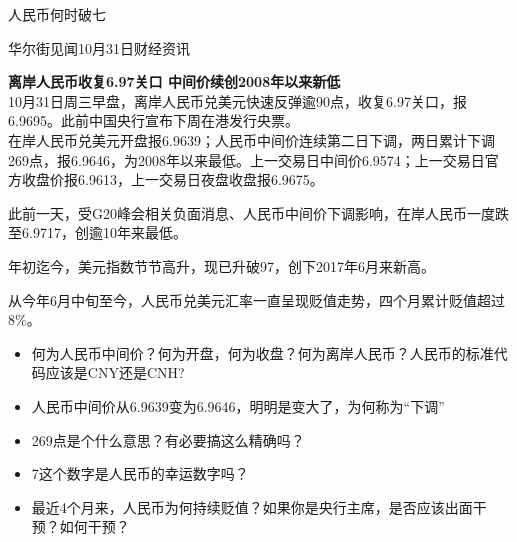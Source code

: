 \documentclass[10pt,hyperref={CJKbookmarks=true},xcolor=dvipsnames,aspectratio=169]{beamer}
\begin{document}
\begin{frame}{人民币何时破七}
\begin{block}{华尔街见闻10月31日财经资讯}
	
	\textbf{离岸人民币收复6.97关口 中间价续创2008年以来新低}\\
	\small
	10月31日周三早盘，离岸人民币兑美元快速反弹逾90点，收复6.97关口，报6.9695。此前中国央行宣布下周在港发行央票。\\
	在岸人民币兑美元开盘报6.9639；人民币中间价连续第二日下调，两日累计下调269点，报6.9646，为2008年以来最低。上一交易日中间价6.9574；上一交易日官方收盘价报6.9613，上一交易日夜盘收盘报6.9675。
	
	此前一天，受G20峰会相关负面消息、人民币中间价下调影响，在岸人民币一度跌至6.9717，创逾10年来最低。
	
	年初迄今，美元指数节节高升，现已升破97，创下2017年6月来新高。
	
	从今年6月中旬至今，人民币兑美元汇率一直呈现贬值走势，四个月累计贬值超过8\%。
\end{block}
\begin{itemize}
	\item 何为人民币中间价？何为开盘，何为收盘？何为离岸人民币？人民币的标准代码应该是CNY还是CNH?
	\item 人民币中间价从6.9639变为6.9646，明明是变大了，为何称为“下调”
	\item 269点是个什么意思？有必要搞这么精确吗？
	\item 7这个数字是人民币的幸运数字吗？
	\item 最近4个月来，人民币为何持续贬值？如果你是央行主席，是否应该出面干预？如何干预？
\end{itemize}
\end{frame}

\end{document}

